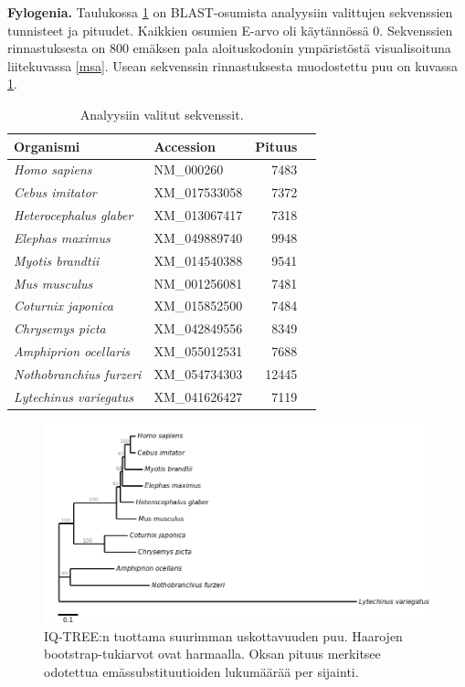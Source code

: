 \documentclass[a4paper,11pt,notitlepage]{article}
\begin{document}
\textbf{Fylogenia.} Taulukossa \ref{blast} on BLAST-osumista analyysiin valittujen sekvenssien tunnisteet ja pituudet. Kaikkien osumien E-arvo oli käytännössä 0. Sekvenssien rinnastuksesta on 800 emäksen pala aloituskodonin ympäristöstä visualisoituna liitekuvassa \ref{msa}. Usean sekvenssin rinnastuksesta muodostettu puu on kuvassa \ref{puu}.

\begin{table}[!h]
	\centering
	\caption{Analyysiin valitut sekvenssit.} \label{blast}
	\begin{tabular}{llrc}
	\toprule
	\textbf{Organismi} & \textbf{Accession} & \textbf{Pituus} \\
	\midrule
	\textit{Homo sapiens} & NM\_000260 & 7483 \\
	\textit{Cebus imitator} & XM\_017533058 & 7372 \\
	\textit{Heterocephalus glaber} & XM\_013067417 & 7318 \\
	\textit{Elephas maximus} & XM\_049889740 & 9948 \\
	\textit{Myotis brandtii} & XM\_014540388 & 9541 \\
	\textit{Mus musculus} & NM\_001256081 & 7481 \\
	\textit{Coturnix japonica} & XM\_015852500 & 7484 \\
	\textit{Chrysemys picta} & XM\_042849556 & 8349 \\
	\textit{Amphiprion ocellaris} & XM\_055012531 & 7688 \\
	\textit{Nothobranchius furzeri} & XM\_054734303 & 12445 \\
	\textit{Lytechinus variegatus} & XM\_041626427 & 7119 \\
	\bottomrule
	\end{tabular}
\end{table}

\begin{figure}[!h]
	\centering
	\includegraphics[width=\textwidth]{tree.png}
	\caption{IQ-TREE:n tuottama suurimman uskottavuuden puu. Haarojen bootstrap-tukiarvot ovat harmaalla. Oksan pituus merkitsee odotettua emässubstituutioiden lukumäärää per sijainti.} \label{puu}
\end{figure}
\end{document}
